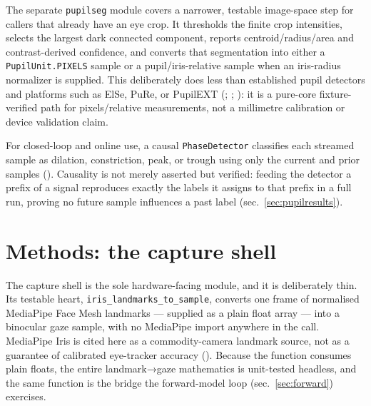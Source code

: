 \documentclass[
]{article}
\begin{document}
The separate \texttt{pupilseg} module covers a narrower, testable
image-space step for callers that already have an eye crop. It
thresholds the finite crop intensities, selects the largest dark
connected component, reports centroid/radius/area and contrast-derived
confidence, and converts that segmentation into either a
\texttt{PupilUnit.PIXELS} sample or a pupil/iris-relative sample when an
iris-radius normalizer is supplied. This deliberately does less than
established pupil detectors and platforms such as ElSe, PuRe, or
PupilEXT (;
;
): it is a pure-core
fixture-verified path for pixels/relative measurements, not a millimetre
calibration or device validation claim.

For closed-loop and online use, a causal \texttt{PhaseDetector}
classifies each streamed sample as dilation, constriction, peak, or
trough using only the current and prior samples
().
Causality is not merely asserted but verified: feeding the detector a
prefix of a signal reproduces exactly the labels it assigns to that
prefix in a full run, proving no future sample influences a past label
(sec.~\ref{sec:pupilresults}).

\section{Methods: the capture shell}\label{sec:capture}

The capture shell is the sole hardware-facing module, and it is
deliberately thin. Its testable heart,
\texttt{iris\_landmarks\_to\_sample}, converts one frame of normalised
MediaPipe Face Mesh landmarks --- supplied as a plain float array ---
into a binocular gaze sample, with no MediaPipe import anywhere in the
call. MediaPipe Iris is cited here as a commodity-camera landmark
source, not as a guarantee of calibrated eye-tracker accuracy
(). Because
the function consumes plain floats, the entire landmark→gaze mathematics
is unit-tested headless, and the same function is the bridge the
forward-model loop (sec.~\ref{sec:forward}) exercises.
\end{document}
